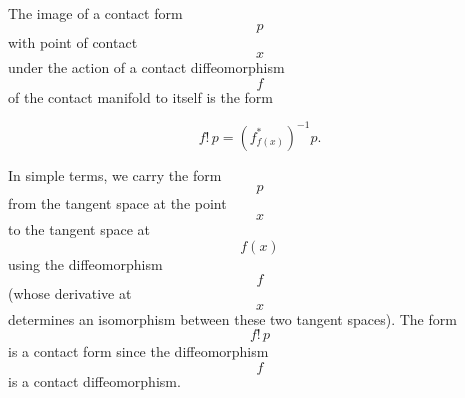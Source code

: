 The image of a contact form $$p$$ with point of contact $$x$$ under the action of a contact diffeomorphism $$f$$ of the contact manifold to itself is the form

$$f!\,p = \left(f^*_{f(x)}\right)^{-1} p.$$

In simple terms, we carry the form $$p$$ from the tangent space at the point $$x$$ to the tangent space at $$f(x)$$ using the diffeomorphism $$f$$ (whose derivative at $$x$$ determines an isomorphism between these two tangent spaces). The form $$f!\,p$$ is a contact form since the diffeomorphism $$f$$ is a contact diffeomorphism.
